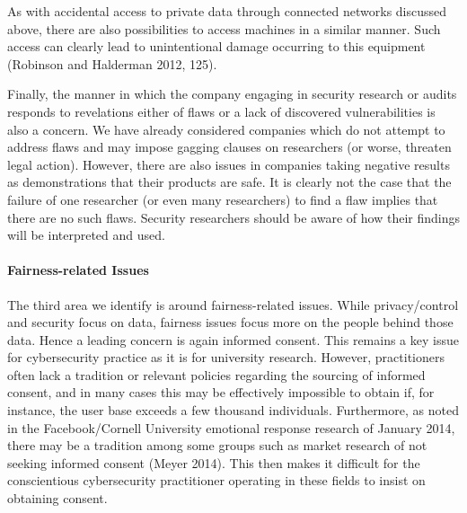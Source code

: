 \documentclass{svjour3}                     %
\begin{document}
As with accidental access to private data through connected networks discussed above, there are also possibilities to access machines in a similar manner. Such access can clearly lead to unintentional damage occurring to this equipment (Robinson and Halderman 2012, 125).

Finally, the manner in which the company engaging in security research or audits responds to revelations either of flaws or a lack of discovered vulnerabilities is also a concern. We have already considered companies which do not attempt to address flaws and may impose gagging clauses on researchers (or worse, threaten legal action). However, there are also issues in companies taking negative results as demonstrations that their products are safe. It is clearly not the case that the failure of one researcher (or even many researchers) to find a flaw implies that there are no such flaws. Security researchers should be aware of how their findings will be interpreted and used.

\paragraph{Fairness-related Issues}
The third area we identify is around fairness-related issues. While privacy/control and security focus on data, fairness issues focus more on the people behind those data. Hence a leading concern is again informed consent.  This remains a key issue for cybersecurity practice as it is for university research.  However, practitioners often lack a tradition or relevant policies regarding the sourcing of informed consent, and in many cases this may be effectively impossible to obtain if, for instance, the user base exceeds a few thousand individuals. Furthermore, as noted in the Facebook/Cornell University emotional response research of January 2014, there may be a tradition among some groups such as market research of not seeking informed consent (Meyer 2014). This then makes it difficult for the conscientious cybersecurity practitioner operating in these fields to insist on obtaining consent.
\end{document}
